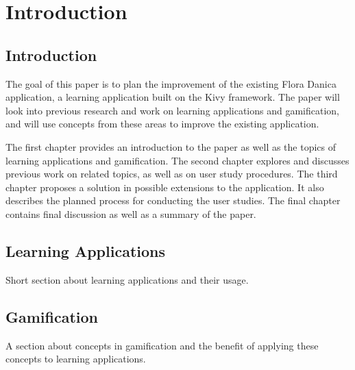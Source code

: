 
\chapter{Introduction}

\label{Chapter1}



\section{Introduction}

The goal of this paper is to plan the improvement of the existing Flora Danica application, a learning application built on the Kivy framework. The paper will look into previous research and work on learning applications and gamification, and will use concepts from these areas to improve the existing application.

The first chapter provides an introduction to the paper as well as the topics of learning applications and gamification. The second chapter explores and discusses previous work on related topics, as well as on user study procedures. The third chapter proposes a solution in possible extensions to the application. It also describes the planned process for conducting the user studies. The final chapter contains final discussion as well as a summary of the paper.


\section{Learning Applications}

Short section about learning applications and their usage.


\section{Gamification}

A section about concepts in gamification and the benefit of applying these concepts to learning applications.